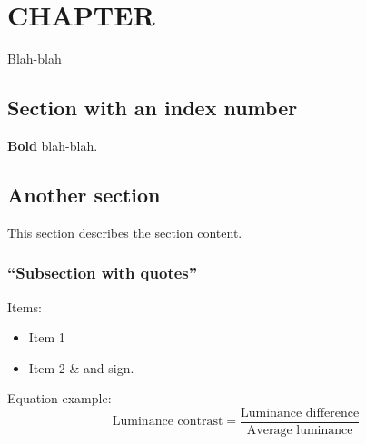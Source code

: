 \chapter{\MakeUppercase{Chapter}}
Blah-blah

\section{Section with an index number}

\textbf{Bold} blah-blah.

\section{Another section}
This section describes the section content.

\subsection{``Subsection with quotes''}
Items:
\begin{itemize}
	\item Item 1
	\item Item 2 \& and sign.
\end{itemize}

Equation example:
\begin{equation*}
	\text{Luminance contrast} = \frac{\text{Luminance difference}}{\text{Average luminance}}
\end{equation*}

